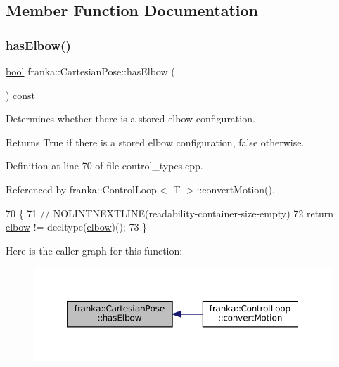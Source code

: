 \subsection{Member Function Documentation}
\mbox{\label{classfranka_1_1CartesianPose_a5fa9f47dbf73ab45f671d89e11f89ccf}} 
\subsubsection{\texorpdfstring{has\+Elbow()}{hasElbow()}}
{\footnotesize\ttfamily \hyperlink{classbool}{bool} franka\+::\+Cartesian\+Pose\+::has\+Elbow (\begin{DoxyParamCaption}{ }\end{DoxyParamCaption}) const\hspace{0.3cm}{\ttfamily [noexcept]}}

Determines whether there is a stored elbow configuration.

\begin{DoxyReturn}{Returns}
True if there is a stored elbow configuration, false otherwise. 
\end{DoxyReturn}


Definition at line 70 of file control\+\_\+types.\+cpp.



Referenced by franka\+::\+Control\+Loop$<$ T $>$\+::convert\+Motion().


\begin{DoxyCode}
70                                             \{
71   \textcolor{comment}{// NOLINTNEXTLINE(readability-container-size-empty)}
72   \textcolor{keywordflow}{return} \hyperlink{classfranka_1_1CartesianPose_abef660743df9cf94d11c556d9c3d25be}{elbow} != decltype(\hyperlink{classfranka_1_1CartesianPose_abef660743df9cf94d11c556d9c3d25be}{elbow})();
73 \}
\end{DoxyCode}
Here is the caller graph for this function\+:
\nopagebreak
\begin{figure}[H]
\begin{center}
\leavevmode
\includegraphics[width=350pt]{classfranka_1_1CartesianPose_a5fa9f47dbf73ab45f671d89e11f89ccf_icgraph}
\end{center}
\end{figure}


